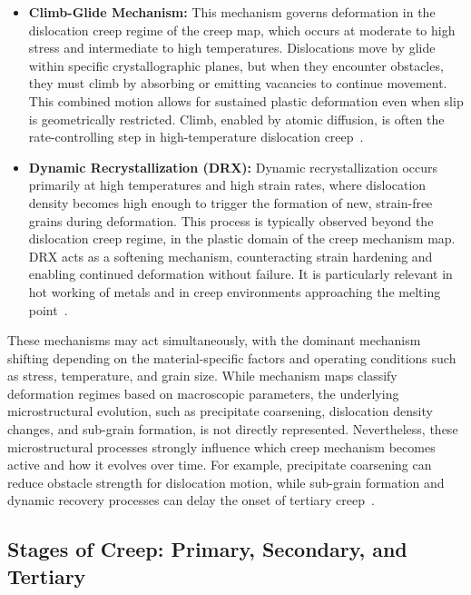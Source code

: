 \documentclass[class=scrbook, crop=false]{standalone}
\begin{document}
\begin{itemize}
	\item \textbf{Climb-Glide Mechanism:}  
	This mechanism governs deformation in the dislocation creep regime of the creep map, which occurs at moderate to high stress and intermediate to high temperatures. Dislocations move by glide within specific crystallographic planes, but when they encounter obstacles, they must climb by absorbing or emitting vacancies to continue movement. This combined motion allows for sustained plastic deformation even when slip is geometrically restricted. Climb, enabled by atomic diffusion, is often the rate-controlling step in high-temperature dislocation creep~\cite{weertman1955theory}.
	
	\item \textbf{Dynamic Recrystallization (DRX):}  
	Dynamic recrystallization occurs primarily at high temperatures and high strain rates, where dislocation density becomes high enough to trigger the formation of new, strain-free grains during deformation. This process is typically observed beyond the dislocation creep regime, in the plastic domain of the creep mechanism map. DRX acts as a softening mechanism, counteracting strain hardening and enabling continued deformation without failure. It is particularly relevant in hot working of metals and in creep environments approaching the melting point~\cite{gourdet2003model}.
		
\end{itemize}

These mechanisms may act simultaneously, with the dominant mechanism shifting depending on the material-specific factors and operating conditions such as stress, temperature, and grain size. While mechanism maps classify deformation regimes based on macroscopic parameters, the underlying microstructural evolution, such as precipitate coarsening, dislocation density changes, and sub-grain formation, is not directly represented. Nevertheless, these microstructural processes strongly influence which creep mechanism becomes active and how it evolves over time. For example, precipitate coarsening can reduce obstacle strength for dislocation motion, while sub-grain formation and dynamic recovery processes can delay the onset of tertiary creep~\cite{chatterjee_creep}.

\subsection{Stages of Creep: Primary, Secondary, and Tertiary}
\label{Subsection::Stages_of_Creep}
\end{document}
